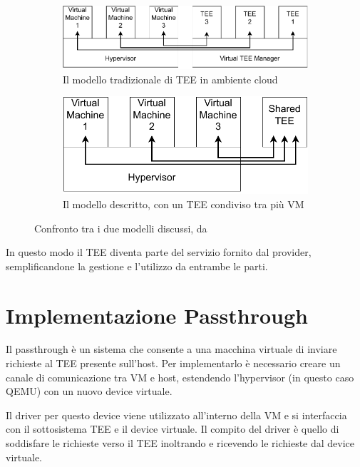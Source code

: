 \documentclass[12pt,italian]{report}
\begin{document}
	\bigbreak

	\begin{figure}[h]
		\centering
		\begin{subfigure}{\columnwidth}
			\centering
			\includegraphics[width=0.8\linewidth]{immagini/common-cloud-tee-model}
			\caption{Il modello tradizionale di TEE in ambiente cloud}
			\label{fig:our-cloud-tee-model}
		\end{subfigure}
	
		\begin{subfigure}{\columnwidth}
			\centering
			\includegraphics[width=0.53\linewidth]{immagini/our-cloud-tee-model}
			\caption{Il modello descritto, con un TEE condiviso tra più VM}
			\label{fig:our-cloud-tee-model}
		\end{subfigure}
		\caption{Confronto tra i due modelli discussi, da \cite{tesi_cutecchia}}
	\end{figure}
	
	In questo modo il TEE diventa parte del servizio fornito dal provider, semplificandone la gestione e l'utilizzo da entrambe le parti.

	\section{Implementazione Passthrough}
	\label{sec:pass_impl}
	Il passthrough è un sistema che consente a una macchina virtuale di inviare richieste al TEE presente sull'host. Per implementarlo è necessario creare un canale di comunicazione tra VM e host, estendendo l'hypervisor (in questo caso QEMU) con un nuovo device virtuale.
	
	Il driver per questo device viene utilizzato all'interno della VM e si interfaccia con il sottosistema TEE e il device virtuale. Il compito del driver è quello di soddisfare le richieste verso il TEE inoltrando e ricevendo le richieste dal device virtuale.
	
\end{document}
